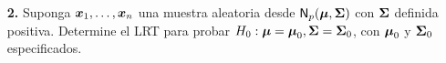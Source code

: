 \documentclass[11pt]{exam}
\newcommand{\bm}[1]{\mbox{\boldmath $#1$}}    %
\begin{document}
\begin{enumerate}
\bigskip

\item[\bf 2.] Suponga $\bm{x}_1,\dots,\bm{x}_n$ una muestra aleatoria desde $\mathsf{N}_p(\bm{\mu},
  \bm{\Sigma})$ con $\bm{\Sigma}$ definida positiva. Determine el LRT para probar $H_0:\bm{\mu} 
  = \bm{\mu}_0, \bm{\Sigma} = \bm{\Sigma}_0$, con $\bm{\mu}_0$ y $\bm{\Sigma}_0$ especificados.

\end{enumerate}
\end{document}
